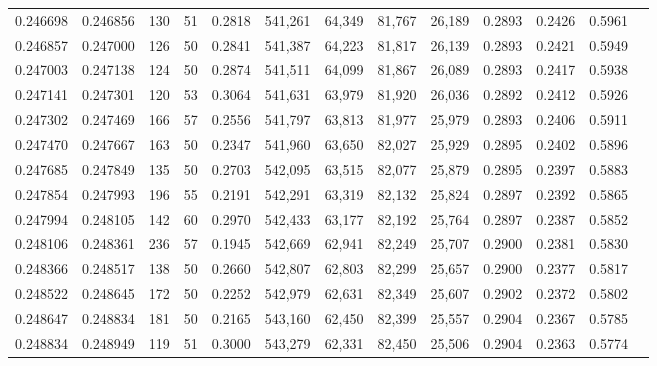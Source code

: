 \begin{tabular}{rrrrrrrrrrrrr}
0.246698 & 0.246856 &   130 &  51 &                                     0.2818 & 541,261 &  64,349 &  81,767 &  26,189 & 0.2893 & 0.2426 & 0.5961 \\
0.246857 & 0.247000 &   126 &  50 &                                     0.2841 & 541,387 &  64,223 &  81,817 &  26,139 & 0.2893 & 0.2421 & 0.5949 \\
0.247003 & 0.247138 &   124 &  50 &                                     0.2874 & 541,511 &  64,099 &  81,867 &  26,089 & 0.2893 & 0.2417 & 0.5938 \\
0.247141 & 0.247301 &   120 &  53 &                                     0.3064 & 541,631 &  63,979 &  81,920 &  26,036 & 0.2892 & 0.2412 & 0.5926 \\
0.247302 & 0.247469 &   166 &  57 &                                     0.2556 & 541,797 &  63,813 &  81,977 &  25,979 & 0.2893 & 0.2406 & 0.5911 \\
0.247470 & 0.247667 &   163 &  50 &                                     0.2347 & 541,960 &  63,650 &  82,027 &  25,929 & 0.2895 & 0.2402 & 0.5896 \\
0.247685 & 0.247849 &   135 &  50 &                                     0.2703 & 542,095 &  63,515 &  82,077 &  25,879 & 0.2895 & 0.2397 & 0.5883 \\
0.247854 & 0.247993 &   196 &  55 &                                     0.2191 & 542,291 &  63,319 &  82,132 &  25,824 & 0.2897 & 0.2392 & 0.5865 \\
0.247994 & 0.248105 &   142 &  60 &                                     0.2970 & 542,433 &  63,177 &  82,192 &  25,764 & 0.2897 & 0.2387 & 0.5852 \\
0.248106 & 0.248361 &   236 &  57 &                                     0.1945 & 542,669 &  62,941 &  82,249 &  25,707 & 0.2900 & 0.2381 & 0.5830 \\
0.248366 & 0.248517 &   138 &  50 &                                     0.2660 & 542,807 &  62,803 &  82,299 &  25,657 & 0.2900 & 0.2377 & 0.5817 \\
0.248522 & 0.248645 &   172 &  50 &                                     0.2252 & 542,979 &  62,631 &  82,349 &  25,607 & 0.2902 & 0.2372 & 0.5802 \\
0.248647 & 0.248834 &   181 &  50 &                                     0.2165 & 543,160 &  62,450 &  82,399 &  25,557 & 0.2904 & 0.2367 & 0.5785 \\
0.248834 & 0.248949 &   119 &  51 &                                     0.3000 & 543,279 &  62,331 &  82,450 &  25,506 & 0.2904 & 0.2363 & 0.5774 \\

\end{tabular}
